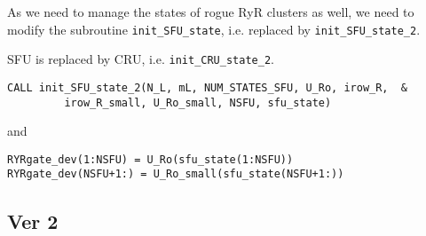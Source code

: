 \begin{enumerate}
As we need to manage the states of rogue RyR clusters as well, we need to
modify the subroutine \verb!init_SFU_state!, i.e. replaced by
\verb!init_SFU_state_2!. 

\begin{framed}
SFU is replaced by CRU, i.e. \verb!init_CRU_state_2!. 
\end{framed}

  \begin{verbatim}
CALL init_SFU_state_2(N_L, mL, NUM_STATES_SFU, U_Ro, irow_R,  &
         irow_R_small, U_Ro_small, NSFU, sfu_state)
  \end{verbatim}

and
\begin{verbatim}
RYRgate_dev(1:NSFU) = U_Ro(sfu_state(1:NSFU))
RYRgate_dev(NSFU+1:) = U_Ro_small(sfu_state(NSFU+1:))
\end{verbatim}
\end{enumerate}

\subsection{Ver 2}
\label{sec:ver_2}


